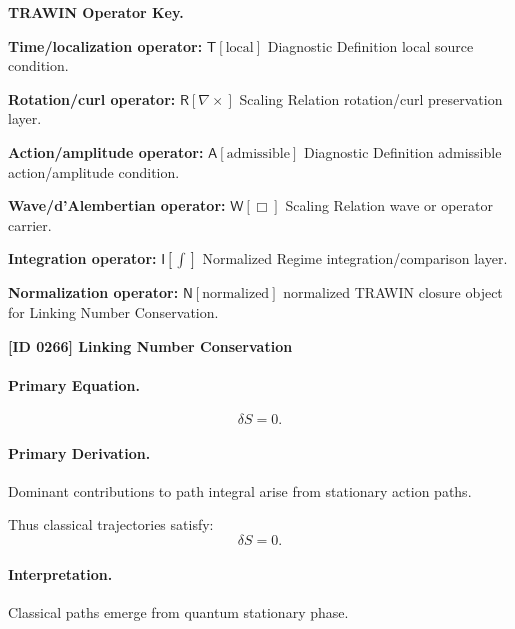 \par\vspace{0.45\baselineskip}
\noindent\begin{minipage}[t]{\linewidth}
\begingroup
\small
\raggedright
\textbf{TRAWIN Operator Key.}\par
\noindent\textbf{Time/localization operator:} $\mathsf{T}\!\left[\mathrm{local}\right]$ Diagnostic Definition local source condition.\par
\noindent\textbf{Rotation/curl operator:} $\mathsf{R}\!\left[\nabla\times\right]$ Scaling Relation rotation/curl preservation layer.\par
\noindent\textbf{Action/amplitude operator:} $\mathsf{A}\!\left[\mathrm{admissible}\right]$ Diagnostic Definition admissible action/amplitude condition.\par
\noindent\textbf{Wave/d'Alembertian operator:} $\mathsf{W}\!\left[\Box\right]$ Scaling Relation wave or operator carrier.\par
\noindent\textbf{Integration operator:} $\mathsf{I}\!\left[\int\right]$ Normalized Regime integration/comparison layer.\par
\noindent\textbf{Normalization operator:} $\mathsf{N}\!\left[\mathrm{normalized}\right]$ normalized TRAWIN closure object for Linking Number Conservation.\par
\endgroup
\end{minipage}

\clearpage
\noindent\textbf{[ID 0266] Linking Number Conservation}\par
\vspace{0.35em}
\paragraph{Primary Equation.}
\begin{equation}
\delta S = 0.
\end{equation}

\paragraph{Primary Derivation.}
Dominant contributions to path integral arise from stationary action paths.

Thus classical trajectories satisfy:
\begin{equation}
\boxed{\delta S = 0.}
\end{equation}

\paragraph{Interpretation.}
Classical paths emerge from quantum stationary phase.

